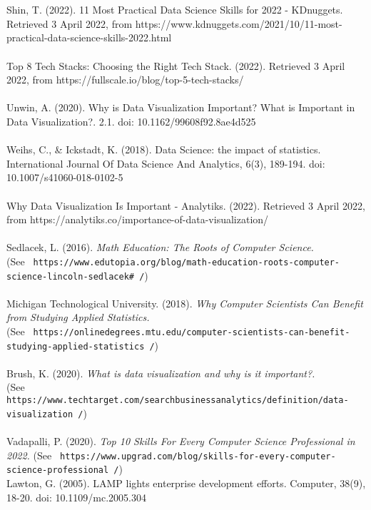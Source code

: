 \documentclass[a4paper, 11pt]{report}
\begin{document}
	\\
	\\
	Shin, T. (2022). 11 Most Practical Data Science Skills for 2022 - KDnuggets. Retrieved 3 April 2022, from https://www.kdnuggets.com/2021/10/11-most-practical-data-science-skills-2022.html
	\\
	\\
	Top 8 Tech Stacks: Choosing the Right Tech Stack. (2022). Retrieved 3 April 2022, from https://fullscale.io/blog/top-5-tech-stacks/
	\\
	\\
	Unwin, A. (2020). Why is Data Visualization Important? What is Important in Data Visualization?. 2.1. doi: 10.1162/99608f92.8ae4d525
	\\
	\\
	Weihs, C., \& Ickstadt, K. (2018). Data Science: the impact of statistics. International Journal Of Data Science And Analytics, 6(3), 189-194. doi: 10.1007/s41060-018-0102-5
	\\
	\\
	Why Data Visualization Is Important - Analytiks. (2022). Retrieved 3 April 2022, from https://analytiks.co/importance-of-data-visualization/
	\\
	\\
	Sedlacek, L. (2016). \textit{ Math Education: The Roots of Computer Science.} \\(See \texttt{ https://www.edutopia.org/blog/math-education-roots-computer-science-lincoln-sedlacek# /})
	\\
	\\
	Michigan Technological University. (2018). \textit{ Why Computer Scientists Can Benefit from Studying Applied Statistics.}\\ (See \texttt{ https://onlinedegrees.mtu.edu/computer-scientists-can-benefit-studying-applied-statistics /})
	\\
	\\
	Brush, K. (2020). \textit{ What is data visualization and why is it important?.} \\(See \texttt{ https://www.techtarget.com/searchbusinessanalytics/definition/data-visualization /})
	\\
	\\
	Vadapalli, P. (2020). \textit{ Top 10 Skills For Every Computer Science Professional in 2022.} (See \texttt{ https://www.upgrad.com/blog/skills-for-every-computer-science-professional /})
	\\
	Lawton, G. (2005). LAMP lights enterprise development efforts. Computer, 38(9), 18-20. doi: 10.1109/mc.2005.304
\end{document}
